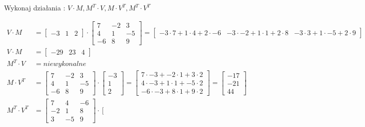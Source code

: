 \documentclass[a4paper]{article}
\begin{document}
\noindent\textnormal{Wykonaj działania : $V \cdot M, M^T \cdot V, M \cdot V^T, M^T \cdot V^T$}

\begin{align*}
V \cdot M &= \left[\begin{matrix}
-3 & 1 & 2
\end{matrix}\right]
\cdot
\left[\begin{matrix}
7 & -2 & 3 \\
4 & 1  & -5 \\
-6 & 8 & 9
\end{matrix}\right] = 
\left[\begin{matrix}
-3 \cdot 7 + 1 \cdot 4 + 2 \cdot -6 & -3 \cdot -2+ 1\cdot 1 + 2 \cdot 8 & -3 \cdot 3 + 1 \cdot -5 + 2 \cdot9
\end{matrix}\right] \\ V \cdot M &= 
\left[\begin{matrix}
-29 & 23 & 4
\end{matrix}\right] \\ 
M^T \cdot V &= niewykonalne \\
M \cdot V^T &= \left[\begin{matrix}
7 & -2 & 3 \\
4 & 1  & -5 \\
-6 & 8 & 9
\end{matrix}\right] \cdot \left[\begin{matrix}
-3 \\ 1 \\ 2
\end{matrix}\right] = 
\left[\begin{matrix}
7 \cdot -3 + -2 \cdot 1 + 3 \cdot 2 \\
4 \cdot -3 + 1 \cdot 1 + -5 \cdot 2 \\
-6 \cdot -3 + 8 \cdot 1 + 9 \cdot 2 
\end{matrix}\right] = 
 \left[\begin{matrix}
-17 \\ -21 \\ 44
\end{matrix}\right]\\
M^T \cdot V^T &= \left[\begin{matrix}
7 & 4 & -6 \\
-2 & 1  & 8 \\
3 & -5 & 9
\end{matrix}\right] \cdot \left[\begin{matrix}

\end{matrix}
\end{align*}
\end{document}

